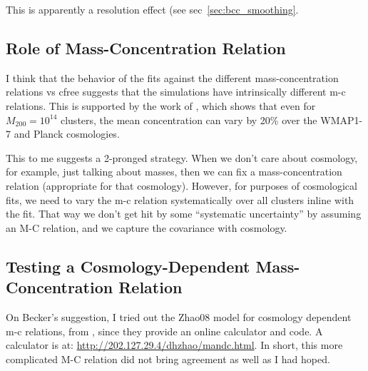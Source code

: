 \documentclass[11pt]{article}
\begin{document}
This is apparently a resolution effect (see sec~\ref{sec:bcc_smoothing}. 


\subsection{Role of Mass-Concentration Relation}

I think that the behavior of the fits against the different mass-concentration relations vs cfree suggests that the simulations have intrinsically different m-c relations. This is supported by the work of \citet{ludlow_mc}, which shows that even for $M_{200} = 10^{14}$ clusters, the mean concentration can vary by 20\% over the WMAP1-7 and Planck cosmologies. 

This to me suggests a 2-pronged strategy. When we don't care about cosmology, for example, just talking about masses, then we can fix a mass-concentration relation (appropriate for that cosmology). However, for purposes of cosmological fits, we need to vary the m-c relation systematically over all clusters inline with the fit. That way we don't get hit by some ``systematic uncertainty'' by assuming an M-C relation, and we capture the covariance with cosmology.


\subsection{Testing a Cosmology-Dependent Mass-Concentration Relation}
\label{sec:cosmo_dependent_mc}

On Becker's suggestion, I tried out the Zhao08 model for cosmology dependent m-c relations, from \citet{zhao_cosmodepmc}, since they provide an online calculator and code. A calculator is at: \url{http://202.127.29.4/dhzhao/mandc.html}. In short, this more complicated M-C relation did not bring agreement as well as I had hoped.
\end{document}
